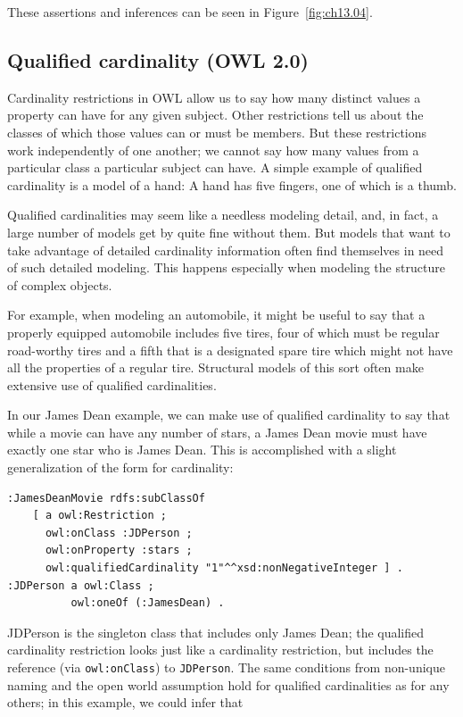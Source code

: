 These assertions and inferences can be seen in Figure~\ref{fig:ch13.04}.

\subsection{Qualified cardinality (OWL 2.0)}

Cardinality restrictions in OWL allow us to say how many distinct values
a property can have for any given subject. Other restrictions tell us
about the classes of which those values can or must be members. But
these restrictions work independently of one another; we cannot say how
many values from a particular class a particular subject can have. A
simple example of qualified cardinality is a model of a hand: A hand has
five fingers, one of which is a thumb.

Qualified cardinalities may seem like a needless modeling detail, and,
in fact, a large number of
models get by quite fine without them. But models that want to take
advantage of detailed cardinality information often find themselves in
need of such detailed modeling. This happens especially when modeling
the structure of complex objects.

For example, when modeling an automobile, it might be useful to say that
a properly equipped automobile includes five tires, four of which must
be regular road-worthy tires and a fifth that is a designated spare tire
which might not have all the properties of a regular tire. Structural
models of this sort often make extensive use of qualified cardinalities.

In our James Dean example, we can make use of qualified cardinality to
say that while a movie can have any number of stars, a James Dean movie
must have exactly one star who is James Dean. This is accomplished with
a slight generalization of the form for cardinality:

\begin{lstlisting}
:JamesDeanMovie rdfs:subClassOf
    [ a owl:Restriction ;
      owl:onClass :JDPerson ;
      owl:onProperty :stars ;
      owl:qualifiedCardinality "1"^^xsd:nonNegativeInteger ] .
:JDPerson a owl:Class ;
          owl:oneOf (:JamesDean) .
\end{lstlisting}

JDPerson is the singleton class that includes only James Dean; the
qualified cardinality restriction looks just like a cardinality
restriction, but includes the reference (via \texttt{owl:onClass}) to
\texttt{JDPerson}. The same conditions from non-unique naming and the open world
assumption hold for qualified cardinalities as for any others; in this
example, we could infer that

